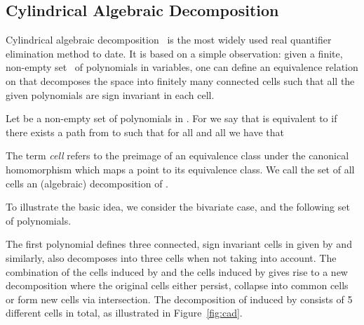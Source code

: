 \documentclass{llncs}
\begin{document}
\subsection{Cylindrical Algebraic Decomposition}

Cylindrical algebraic decomposition~\cite{collins} is the most
widely used real quantifier elimination method to date.  It is based on a simple
observation: given a finite, non-empty set~ of polynomials in  variables,
one can define an equivalence relation on  that decomposes the space
into finitely many connected cells such that all the given polynomials are sign
invariant in each cell.

\begin{definition}
  Let  be a non-empty set of polynomials in . For 
   we say that  is equivalent to  if there exists a path
   from  to  such that for all
   and all  we have that
  
  The term \emph{cell} refers to the preimage of an equivalence class
  under the canonical homomorphism which maps a point to its
  equivalence class. We call the set of all cells an (algebraic)
  decomposition of .
\end{definition}

\begin{example}
\label{ex:cad:1}
  To illustrate the basic idea, we consider the bivariate case, and the
  following set of polynomials.
  
  The first polynomial defines three connected, sign invariant cells in
   given by
   and similarly,  also
  decomposes  into three cells when not taking  into
  account. The combination of the cells induced by  and the cells
  induced by  gives rise to a new decomposition where the
  original cells either persist, collapse into common cells or form
  new cells via intersection. The decomposition of  induced
  by  consists of 5 different cells in total, as illustrated
  in Figure~\ref{fig:cad}.
\end{example}
\end{document}
